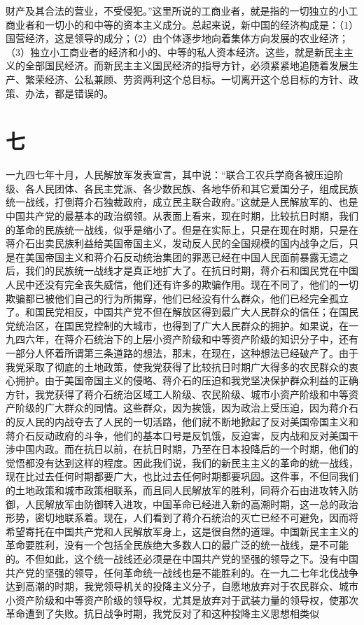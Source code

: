 财产及其合法的营业，不受侵犯。”这里所说的工商业者，就是指的一切独立的小工商业者和一切小的和中等的资本主义成分。总起来说，新中国的经济构成是：（1）国营经济，这是领导的成分；（2）由个体逐步地向着集体方向发展的农业经济；（3）独立小工商业者的经济和小的、中等的私人资本经济。这些，就是新民主主义的全部国民经济。而新民主主义国民经济的指导方针，必须紧紧地追随着发展生产、繁荣经济、公私兼顾、劳资两利这个总目标。一切离开这个总目标的方针、政策、办法，都是错误的。

\section*{七}

一九四七年十月，人民解放军发表宣言，其中说：“联合工农兵学商各被压迫阶级、各人民团体、各民主党派、各少数民族、各地华侨和其它爱国分子，组成民族统一战线，打倒蒋介石独裁政府，成立民主联合政府。”这就是人民解放军的、也是中国共产党的最基本的政治纲领。从表面上看来，现在时期，比较抗日时期，我们的革命的民族统一战线，似乎是缩小了。但是在实际上，只是在现在时期，只是在蒋介石出卖民族利益给美国帝国主义，发动反人民的全国规模的国内战争之后，只是在美国帝国主义和蒋介石反动统治集团的罪恶已经在中国人民面前暴露无遗之后，我们的民族统一战线才是真正地扩大了。在抗日时期，蒋介石和国民党在中国人民中还没有完全丧失威信，他们还有许多的欺骗作用。现在不同了，他们的一切欺骗都已被他们自己的行为所揭穿，他们已经没有什么群众，他们已经完全孤立了。和国民党相反，中国共产党不但在解放区得到最广大人民群众的信任；在国民党统治区，在国民党控制的大城市，也得到了广大人民群众的拥护。如果说，在一九四六年，在蒋介石统治下的上层小资产阶级和中等资产阶级的知识分子中，还有一部分人怀着所谓第三条道路的想法，那末，在现在，这种想法已经破产了。由于我党采取了彻底的土地政策，使我党获得了比较抗日时期广大得多的农民群众的衷心拥护。由于美国帝国主义的侵略、蒋介石的压迫和我党坚决保护群众利益的正确方针，我党获得了蒋介石统治区域工人阶级、农民阶级、城市小资产阶级和中等资产阶级的广大群众的同情。这些群众，因为挨饿，因为政治上受压迫，因为蒋介石的反人民的内战夺去了人民的一切活路，他们就不断地掀起了反对美国帝国主义和蒋介石反动政府的斗争，他们的基本口号是反饥饿，反迫害，反内战和反对美国干涉中国内政。而在抗日以前，在抗日时期，乃至在日本投降后的一个时期，他们的觉悟都没有达到这样的程度。因此我们说，我们的新民主主义的革命的统一战线，现在比过去任何时期都要广大，也比过去任何时期都要巩固。这件事，不但同我们的土地政策和城市政策相联系，而且同人民解放军的胜利，同蒋介石由进攻转入防御，人民解放军由防御转入进攻，中国革命已经进入新的高潮时期，这一总的政治形势，密切地联系着。现在，人们看到了蒋介石统治的灭亡已经不可避免，因而将希望寄托在中国共产党和人民解放军身上，这是很自然的道理。中国新民主主义的革命要胜利，没有一个包括全民族绝大多数人口的最广泛的统一战线，是不可能的。不但如此，这个统一战线还必须是在中国共产党的坚强的领导之下。没有中国共产党的坚强的领导，任何革命统一战线也是不能胜利的。在一九二七年北伐战争达到高潮的时期，我党领导机关的投降主义分子，自愿地放弃对于农民群众、城市小资产阶级和中等资产阶级的领导权，尤其是放弃对于武装力量的领导权，使那次革命遭到了失败。抗日战争时期，我党反对了和这种投降主义思想相类似